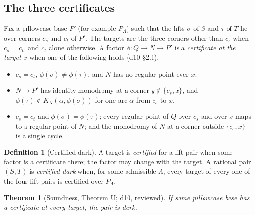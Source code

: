 \documentclass[11pt]{article}
\newtheorem{theorem}{Theorem}
\theoremstyle{definition}
\newtheorem{definition}{Definition}
\theoremstyle{remark}
\newcommand{\Par}{\mathrm{Par}}
\newcommand{\Rig}{\mathrm{Rig}}
\newcommand{\Cut}{\mathrm{Cut}}
\begin{document}
\subsection{The three certificates}
Fix a pillowcase base $P'$ (for example $P_\Lambda$) such that the lifts
$\sigma$ of $S$ and $\tau$ of $T$ lie over corners $c_s$ and $c_t$ of $P'$.
The targets are the three corners other than $c_s$ when $c_s=c_t$, and $c_t$
alone otherwise. A factor $\phi\colon Q\to N\to P'$ is a \emph{certificate at
the target $x$} when one of the following holds (d10 \S2.1).
\begin{itemize}
\item[$\Par(x)$:] $c_s=c_t$, $\phi(\sigma)\ne\phi(\tau)$, and $N$ has no
regular point over $x$.
\item[$\Rig(x)$:] $N\to P'$ has identity monodromy at a corner $y\notin\{c_s,x\}$,
and $\phi(\tau)\notin K_N(\alpha,\phi(\sigma))$ for one arc $\alpha$ from $c_s$
to $x$.
\item[$\Cut(x)$:] $c_s=c_t$ and $\phi(\sigma)=\phi(\tau)$; every regular point
of $Q$ over $c_s$ and over $x$ maps to a regular point of $N$; and the
monodromy of $N$ at a corner outside $\{c_s,x\}$ is a single cycle.
\end{itemize}

\begin{definition}[Certified dark]\label{def:certified}
A target is \emph{certified} for a lift pair when some factor is a certificate
there; the factor may change with the target. A rational pair $(S,T)$ is
\emph{certified dark} when, for some admissible $\Lambda$, every target of every
one of the four lift pairs is certified over $P_\Lambda$.
\end{definition}

\begin{theorem}[Soundness, Theorem U; d10, reviewed]\label{thm:U}
If some pillowcase base has a certificate at every target, the pair is dark.
\end{theorem}
\end{document}
